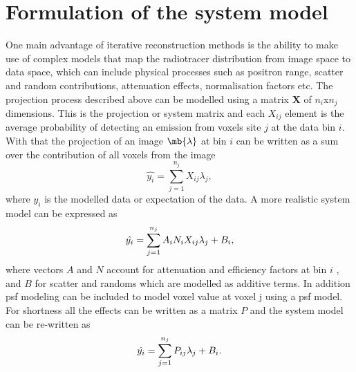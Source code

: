 \section{Formulation of the system model}
One main advantage of iterative reconstruction methods is the ability to make use of complex models that map the radiotracer distribution from image space to data space, which can include physical processes such as positron range, scatter and random contributions, attenuation effects, normalisation factors etc.
The projection process described above can be modelled using a matrix $\bm{X}$ of $n_i$x$n_j$ dimensions. This is the projection or system matrix and each ${X}_{ij}$ element is the average probability of detecting an emission from voxels site $j$ at the data bin $i$. With that the projection of an image $\mb{\lambda}$ at bin $i$ can be written as a sum over the contribution of all voxels from the image
\begin{equation}
   \hat{y_i} = \sum_{j=1}^{n_j} X_{ij} \lambda_j  ,
\end{equation}
where $\hat{y_i}$ is the modelled data or expectation of the data.  A more realistic system model can be expressed as 
\begin{equation}
   \hat{y_i} = \sum_{j=1}^{n_j} A_{i}N_{i}X_{ij} \lambda_j + B_{i} \\,
\end{equation}
where vectors $A$ and $N$ account for attenuation and efficiency factors at bin $i$ , and $B$ for scatter and randoms which are modelled as additive terms. In addition \gls{psf} modeling can be included to model voxel value at voxel j using a \gls{psf} model. 
For shortness all the effects can be written as a matrix $P$ and the system model can be re-written as
\begin{equation}
   \hat{y_i} = \sum_{j=1}^{n_j} P_{ij} \lambda_j + B_{i} \\.
   \label{eqn:system_model}
\end{equation}

